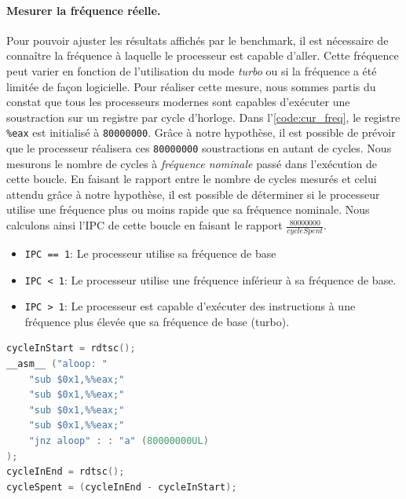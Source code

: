         \paragraph{Mesurer la fréquence réelle.} Pour pouvoir ajuster les résultats affichés par le benchmark, il est nécessaire de connaître la fréquence à laquelle le processeur est capable d'aller. Cette fréquence peut varier en fonction de l'utilisation du mode \textit{turbo} ou si la fréquence a été limitée de façon logicielle. Pour réaliser cette mesure, nous sommes partis du constat que tous les processeurs modernes sont capables d'exécuter une soustraction sur un registre par cycle d'horloge. Dans l'\autoref{code:cur_freq}, le registre \verb|%eax| est initialisé à \verb|80000000|. Grâce à notre hypothèse, il est possible de prévoir que le processeur réalisera ces \verb|80000000| soustractions en autant de cycles. Nous mesurons le nombre de cycles à \textit{fréquence nominale} passé dans l'exécution de cette boucle. En faisant le rapport entre le nombre de cycles mesurés et celui attendu grâce à notre hypothèse, il est possible de déterminer si le processeur utilise une fréquence plus ou moins rapide que sa fréquence nominale. Nous calculons ainsi l'IPC de cette boucle en faisant le rapport $\frac{80000000}{cycleSpent}$.
        \begin{itemize}
            \item \verb|IPC == 1|: Le processeur utilise sa fréquence de base
            \item \verb|IPC < 1|: Le processeur utilise une fréquence inférieur à sa fréquence de base.
            \item \verb|IPC > 1|: Le processeur est capable d'exécuter des instructions à une fréquence plus élevée que sa fréquence de base (turbo).
        \end{itemize}
    
\begin{lstlisting}[label=code:cur_freq ,language=C, caption=Mesure de la fréquence de base du processeur]
cycleInStart = rdtsc();
__asm__ ("aloop: "
    "sub $0x1,%%eax;"
    "sub $0x1,%%eax;"
    "sub $0x1,%%eax;"
    "sub $0x1,%%eax;"
    "jnz aloop" : : "a" (80000000UL)
);
cycleInEnd = rdtsc();
cycleSpent = (cycleInEnd - cycleInStart);
\end{lstlisting}   
    
    
